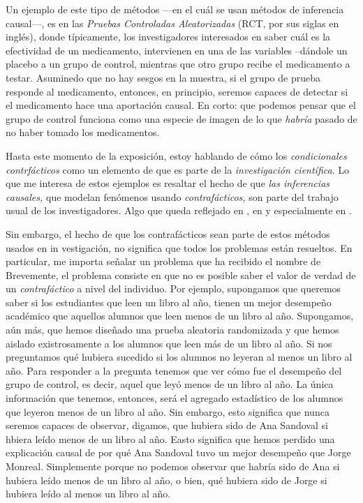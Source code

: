 Un ejemplo de este tipo de métodos ---en el cuál se usan
métodos de inferencia causal---, es en las \emph{Pruebas Controladas
Aleatorizadas} (RCT, por sus siglas en inglés), donde típicamente,
los investigadores interesados en saber cuál es la efectividad de un
medicamento, intervienen en una de las variables --dándole un
placebo a un grupo de control, mientras que otro grupo recibe el
medicamento a testar. Asuminedo que no hay sesgos en la muestra, si
el grupo de prueba responde al medicamento, entonces, en principio,
seremos capaces de detectar si el medicamento hace una aportación
causal. En corto: que podemos pensar que el grupo de control
funciona como una especie de imagen de lo que \emph{habría} pasado
de no haber tomado los medicamentos.

Hasta este momento de la exposición, estoy hablando de cómo los
\emph{condicionales contrfácticos} como un elemento de que es parte
de la \emph{investigación científica}. Lo que me interesa de estos
ejemplos es resaltar el hecho de que \emph{las inferencias causales,} que modelan fenómenos usando \emph{contrafácticos,} son parte del trabajo usual de los investigadores. Algo que queda reflejado en \parencite{Pearl2016}, en \parencite{Pearl2018} y especialmente en
\parencite{llaudet2023}.

Sin embargo, el hecho de que los contrafácticos sean parte de estos
métodos usados en in vestigación, no significa que todos los
problemas están resueltos. En particular, me importa señalar un
problema que ha recibido el nombre de  Brevemente, el problema consiste en que no
es posible saber el valor de verdad de un \emph{contrafáctico} a
nivel del individuo. Por ejemplo, supongamos que queremos saber si
los estudiantes que leen un libro al año, tienen un mejor desempeño
académico que aquellos alumnos que leen menos de un libro al año.
Supongamos, aún más, que hemos diseñado una prueba aleatoria
randomizada y que hemos aislado existrosamente a los alumnos que
leen más de un libro al año. Si nos preguntamos qué hubiera sucedido
si los alumnos no leyeran al menos un libro al año. Para responder a
la pregunta  tenemos que ver cómo
fue el desempeño del grupo de control, es decir, aquel que leyó
menos de un libro al año. La única información que tenemos,
entonces, será el agregado estadístico de los alumnos que leyeron
menos de un libro al año. Sin embargo, esto significa que nunca
seremos capaces de observar, digamos, que hubiera sido de Ana
Sandoval si hbiera leído menos de un libro al año. Easto significa
que hemos perdido una explicación causal de por qué Ana Sandoval
tuvo un mejor desempeño que Jorge Monreal. Simplemente porque no
podemos observar que habría sido de Ana si hubiera leído menos de un
libro al año, o bien, qué hubiera sido de Jorge si hubiera leído al
menos un libro al año.

